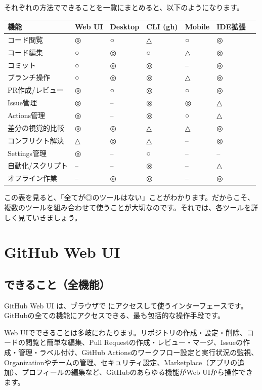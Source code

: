 それぞれの方法でできることを一覧にまとめると、以下のようになります。

\begin{table}[h]
\centering
\begin{tabular}{lllllll}
\hline
機能 & Web UI & Desktop & CLI (gh) & Mobile & IDE拡張 \\
\hline
コード閲覧 & ◎ & ○ & △ & ○ & ◎ \\
コード編集 & ○ & ◎ & ○ & △ & ◎ \\
コミット & ○ & ◎ & ◎ & -- & ◎ \\
ブランチ操作 & ○ & ◎ & ◎ & △ & ◎ \\
PR作成/レビュー & ◎ & ○ & ◎ & ○ & ◎ \\
Issue管理 & ◎ & -- & ◎ & ◎ & △ \\
Actions管理 & ◎ & -- & ◎ & ○ & △ \\
差分の視覚的比較 & ◎ & ◎ & △ & △ & ◎ \\
コンフリクト解決 & △ & ◎ & △ & -- & ◎ \\
Settings管理 & ◎ & -- & ○ & -- & -- \\
自動化/スクリプト & -- & -- & ◎ & -- & △ \\
オフライン作業 & -- & ◎ & ◎ & -- & ◎ \\
\hline
\end{tabular}
\end{table}

この表を見ると、「全てが◎のツールはない」ことがわかります。だからこそ、複数のツールを組み合わせて使うことが大切なのです。それでは、各ツールを詳しく見ていきましょう。

\section{GitHub Web UI}

\subsection{できること（全機能）}

GitHub Web UI は、ブラウザで  にアクセスして使うインターフェースです。GitHubの全ての機能にアクセスできる、最も包括的な操作手段です。

Web UIでできることは多岐にわたります。リポジトリの作成・設定・削除、コードの閲覧と簡単な編集、Pull Requestの作成・レビュー・マージ、Issueの作成・管理・ラベル付け、GitHub Actionsのワークフロー設定と実行状況の監視、Organizationやチームの管理、セキュリティ設定、Marketplace（アプリの追加）、プロフィールの編集など、GitHubのあらゆる機能がWeb UIから操作できます。


